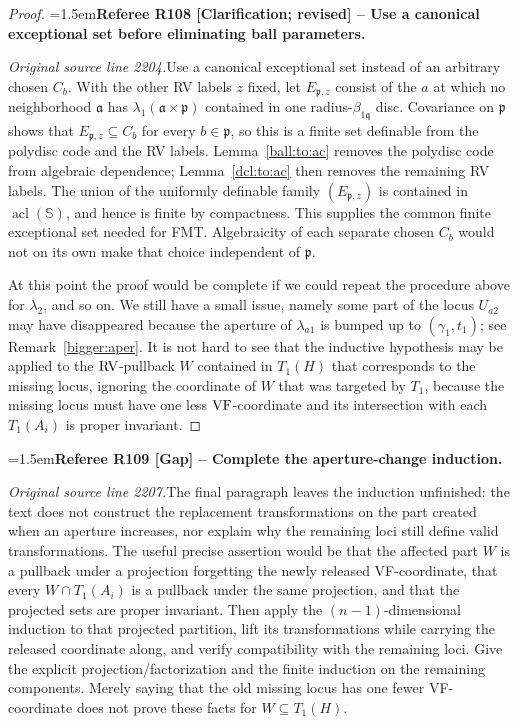 \documentclass[12pt]{amsart}
\newcommand{\RefereeRemark}[4]{%
  \par\medskip\begingroup\normalfont\small\color{RefereePurple}%
  \emergencystretch=1.5em\noindent\textbf{Referee R#1 [#2] -- #3.}\par\nobreak\noindent #4\par
  \endgroup\medskip
}
\theoremstyle{plain}
\theoremstyle{definition}
\theoremstyle{remark}
\numberwithin{equation}{section}
\theoremstyle{plain}
\newcommand{\VF}{\textup{VF}}
\newcommand{\RV}{\textup{RV}}
\DeclareMathOperator{\acl}{acl}
\newcommand{\ga}{\mathfrak{a}}
\newcommand{\gp}{\mathfrak{p}}
\newcommand{\gq}{\mathfrak{q}}
\newcommand{\0}{\emptyset}
\begin{document}
\begin{proof}
\RefereeRemark{108}{Clarification; revised}{Use a canonical exceptional set before eliminating ball parameters}{%
\textit{Original source line 2204.}\quad Use a canonical exceptional set instead of an arbitrary chosen $C_b$. With the other RV labels $z$ fixed, let $E_{\gp,z}$ consist of the $a$ at which no neighborhood $\ga$ has $\lambda_1(\ga\times\gp)$ contained in one radius-$\beta_{1\gq}$ disc. Covariance on $\gp$ shows that $E_{\gp,z}\subseteq C_b$ for every $b\in\gp$, so this is a finite set definable from the polydisc code and the RV labels. Lemma~\ref{ball:to:ac} removes the polydisc code from algebraic dependence; Lemma~\ref{dcl:to:ac} then removes the remaining RV labels. The union of the uniformly definable family $(E_{\gp,z})$ is contained in $\acl(\mathbb S)$, and hence is finite by compactness. This supplies the common finite exceptional set needed for FMT. Algebraicity of each separate chosen $C_b$ would not on its own make that choice independent of $\gp$.
}

At this point the proof would be complete if we could repeat the procedure above for $\lambda_2$, and so on. We still have a small issue, namely some part of the locus $U_{a2}$ may have disappeared because the aperture of  $\lambda_{a1}$ is bumped up to $(\gamma_{1}, t_{1})$; see Remark~\ref{bigger:aper}. It is not hard to see that the inductive hypothesis may be applied to the $\RV$-pullback $W$ contained in $T_1(H)$ that corresponds to the missing locus, ignoring the coordinate of $W$ that was targeted by $T_1$, because the missing locus must have one less $\VF$-coordinate and its intersection with each $T_1(A_i)$ is proper invariant.
\end{proof}

\RefereeRemark{109}{Gap}{Complete the aperture-change induction}{%
\textit{Original source line 2207.}\quad The final paragraph leaves the induction unfinished: the text does not construct the replacement transformations on the part created when an aperture increases, nor explain why the remaining loci still define valid transformations. The useful precise assertion would be that the affected part $W$ is a pullback under a projection forgetting the newly released VF-coordinate, that every $W\cap T_1(A_i)$ is a pullback under the same projection, and that the projected sets are proper invariant. Then apply the $(n-1)$-dimensional induction to that projected partition, lift its transformations while carrying the released coordinate along, and verify compatibility with the remaining loci. Give the explicit projection/factorization and the finite induction on the remaining components. Merely saying that the old missing locus has one fewer VF-coordinate does not prove these facts for $W\subseteq T_1(H)$.
}
\end{document}
